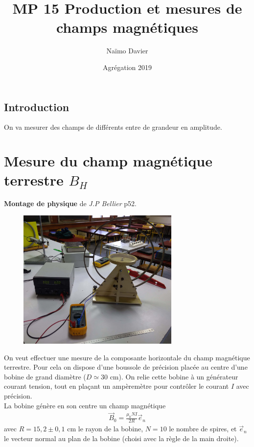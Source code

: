\documentclass[12pt,prb,aps,epsf]{article}
\begin{document}
	
	\title{MP 15 Production et mesures de champs magnétiques}
		\author{Naïmo Davier}
		\date{Agrégation 2019}
		
	\maketitle
	
	\tableofcontents
	
	\pagebreak
	
\subsection{Introduction}
On va mesurer des champs de différents entre de grandeur en amplitude.
	
\section{Mesure du champ magnétique terrestre $B_H$}
\textbf{Montage de physique} de \textit{J.P Bellier} p52.\\

\begin{figure}[h]
 	\centering \includegraphics[width=8cm]{chp_terrestre}
\end{figure}
On veut effectuer une mesure de la composante horizontale du champ magnétique terrestre. Pour cela on dispose d'une boussole de précision placée au centre d'une bobine de grand diamètre ($D\simeq30$ cm). On relie cette bobine à un générateur courant tension, tout en plaçant un ampèremètre pour contrôler le courant $I$ avec précision.\\
La bobine génère en son centre un champ magnétique 
\begin{eqnarray}
\vec{B}_0 = \frac{\mu_0NI}{2R}\vec{e}_n
\end{eqnarray}
avec $R = 15,2\pm0,1$ cm le rayon de la bobine, $N = 10$ le nombre de spires, et $\vec{e}_n$ le vecteur normal au plan de la bobine (choisi avec la règle de la main droite).\\
\end{document}
